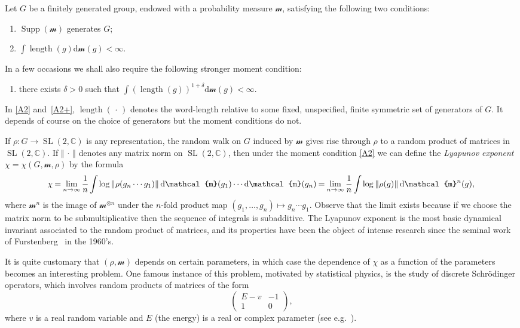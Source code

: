 \documentclass[11pt]{article}
\theoremstyle{definition}
\numberwithin{equation}{section}
\numberwithin{figure}{section}
\numberwithin{table}{section}
\DeclareMathOperator{\supp}{Supp}
\DeclareMathOperator{\length}{length}
\DeclareMathOperator{\SL}{SL}
\newcommand{\sm}{\mathcal{m}}
\newcommand{\norm}[1]{\left\Vert#1\right\Vert}
\newcommand{\unsur}[1]{\frac{1}{#1}}
\newcommand{\SLC}{\SL(2,\mathbb C)}
\newcommand*{\dd}{\mathrm{d}}
\newcommand*{\dsm}{\dd \sm}
\newcommand*{\mk}{\mkern -1mu}
\begin{document}
Let $G$ be a finitely generated group, endowed with a probability measure $\sm$, satisfying the following two conditions:
\begin{enumerate}\renewcommand{\theenumi}{A\arabic{enumi}}
\item \label{A1} $\supp(\sm)$ generates $G$;
\item \label{A2} $ \int \length(g) \dsm(g)<\infty$.
\end{enumerate}
In a few occasions we shall also require the following stronger moment condition:
\begin{enumerate}\renewcommand{\theenumi}{A\arabic{enumi}${}^+$}\setcounter{enumi}{1}
\item \label{A2+} there exists $\delta >0$ such that $ \int (\length(g))^{1+\delta} \dsm(g)<\infty$.
\end{enumerate}
In \eqref{A2} and~\eqref{A2+}, $\length({\,\cdot\,})$ denotes the word-length relative to some fixed, unspecified, finite symmetric set of generators of $G$. It depends of course on the choice of generators but the moment conditions do not.


If $\rho:G \to \SLC$ is any representation, the random walk on $G$ induced by $\sm$ gives rise through $\rho$ to a random product of matrices in $\SLC$. If $\norm{{\,\cdot\,}}$ denotes any matrix norm on $\SLC$, then under the moment condition \eqref{A2} we can define the \emph{Lyapunov exponent} $\chi = \chi(G, \sm, \rho)$ by the formula
\begin{equation}
\label{def:lyapunov exponent intro}
\!\chi \mk=\mk \lim_{n\to\infty} \unsur{n} \mk\int\mk \log\norm{\rho(g_n\cdots g_1)} \dsm(g_1) \cdots \dsm(g_n) \mk=\mk \lim_{n\to\infty} \unsur{n} \mk\int\mk \log\norm{\rho(g)} \dsm^n(g),
\end{equation}
where $\sm^n$ is the image of $\sm^{\otimes n}$ under the $n$-fold product map $(g_1, \ldots, g_n)\mapsto g_n\cdots g_1$. Observe that the limit exists because if we choose the matrix norm to be submultiplicative then the sequence of integrals is subadditive. The Lyapunov exponent is the most basic dynamical invariant associated to the random product of matrices, and its properties have been the object of intense research since the seminal work of Furstenberg~\cite{furstenberg} in the 1960's.

It is quite customary that $(\rho, \sm)$ depends on certain parameters, in which case the dependence of $\chi$ as a function of the parameters becomes an interesting problem. One famous instance of this problem, motivated by statistical physics, is the study of discrete Schr\"odinger operators, which involves random products of matrices of the form
\[
\begin{pmatrix} E-v & -1 \\ 1 & 0
\end{pmatrix},
\]
where $v$ is a real random variable and $E$ (the energy) is a real or complex parameter
(see e.g.~\cite{bougerol-lacroix}).
\end{document}
